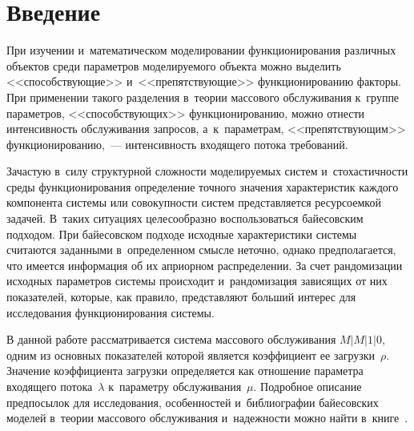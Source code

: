 
  
\vspace*{10pt}



\thispagestyle{headings}

\begin{multicols}{2}

\label{st\stat}

\section{Введение}


При изучении и~математическом моделировании функционирования различных объектов 
среди параметров моделируемого объекта можно выделить <<способствующие>> 
и~<<препятствующие>> функционированию факторы. При применении такого 
разделения в~теории массового обслуживания\linebreak
 к~группе параметров, 
<<способствующих>> функционированию, можно отнести интенсивность обслуживания 
запросов, а~к~параметрам, <<пре\-пят\-ст\-ву\-ющим>> функционированию,~--- 
интенсивность входяще\-го потока требований. 

Зачастую в~силу структурной сложности 
моделируемых систем и~стохастичности среды функ\-ционирования определение точного 
значения характеристик каждого компонента системы или\linebreak
 со\-во\-куп\-ности сис\-тем 
представляется ресурсоемкой задачей. В~таких ситуациях целесообразно воспользоваться 
байесовским подходом. 
%
При байесовском подходе исходные характеристики системы 
считаются заданными в~определенном смысле неточно, однако предполагается, что 
имеется информация об их априорном распределении. За счет рандомизации исходных 
параметров системы происходит и~рандомизация зависящих от них показателей, которые, 
как правило, пред\-став\-ля\-ют больший интерес для исследования функционирования системы.

В данной работе рассматривается система массового обслуживания $M|M|1|0$, 
одним из основных показателей которой является коэффициент ее загрузки~$\rho$. 
Значение коэффициента загрузки определяется как отношение параметра входящего 
потока~$\lambda$ к~параметру обслуживания~$\mu$. Подробное описание предпосылок 
для исследования, особенностей и~библиографии байесовских моделей в~теории 
массового обслуживания и~надежности можно найти в~книге~\cite{KuSh2015}.


\end{multicols}
